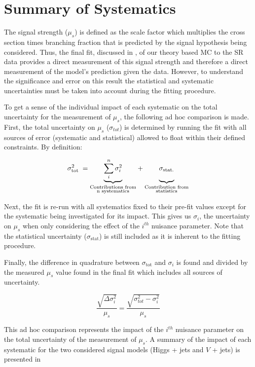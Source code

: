 \section{Summary of Systematics} \label{sec:systematics:summary}

The signal strength ($\mu_{s}$) is defined as the scale factor which multiplies
the cross section times branching fraction that is predicted by the signal
hypothesis being considered.  Thus, the final fit, discussed in
, of our theory based MC to the SR data provides a direct
measurement of this signal strength and therefore a direct measurement of the
model's prediction given the data. However, to understand the significance and
error on this result the statistical and systematic uncertainties must be taken
into account during the fitting procedure.

To get a sense of the individual impact of each systematic on the total
uncertainty for the measurement of $\mu_{s}$, the following ad hoc comparison
is made.  First, the total uncertainty on $\mu_{s}$ ($\sigma_{tot}$) is
determined by running the fit with all sources of error (systematic and
statistical) allowed to float within their defined constraints.  By definition:

$$ \sigma_{\text{tot}}^{2} \; = {\underbrace{\sum_{i}^{n} \sigma_{i}^{2}}_{\substack{\text{Contributions from} \\ \text{n systematics}}}} + {\underbrace{\vphantom{\sum_{i}^{n}} \sigma_{\text{stat.}}}_{\substack{\text{Contribution from} \\ \text{statistics}}}}$$

Next, the fit is re-run with all systematics fixed to their pre-fit values
except for the systematic being investigated for its impact. This gives us
$\sigma_{i}$, the uncertainty on $\mu_{s}$ when only considering the effect of
the $i^{th}$ nuisance parameter. Note that the statistical uncertainty
($\sigma_{\text{stat}}$) is still included as it is inherent to the fitting
procedure.

Finally, the difference in quadrature between $\sigma_{\text{tot}}$ and
$\sigma_{i}$ is found and divided by the measured $\mu_{s}$ value found in the
final fit which includes all sources of uncertainty. 

$$ \frac{\sqrt{\Delta \sigma_i^2}}{\mu_{s}} = \frac{\sqrt{\sigma_{tot}^2 - \sigma_i^2}}{\mu_{s}} $$

This ad hoc comparison represents the impact of the $i^{th}$ nuisance parameter
on the total uncertainty of the measurement of $\mu_{s}$. A summary of the
impact of each systematic for the two considered signal models (Higgs + jets
and $V$ + jets) is presented in 

